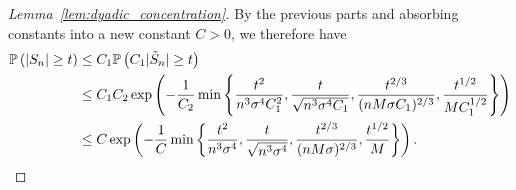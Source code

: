 \begin{proof}[Lemma~\ref{lem:dyadic_concentration}]

  By the previous parts
  and absorbing constants into a new constant $C > 0$,
  we therefore have
  \begin{align*}
    \P\left(
      |S_n| \geq t
    \right)
    &\leq
    C_1 \P\left(
      C_1 |\tilde S_n| \geq t
    \right) \\
    &\leq
    C_1 C_2 \exp\left(
      -\frac{1}{C_2}
      \min \left\{
      \frac{t^2}{n^3 \sigma^4 C_1^2},
      \frac{t}{\sqrt{n^3 \sigma^4 C_1}},
      \frac{t^{2/3}}{(n M \sigma C_1)^{2/3}},
      \frac{t^{1/2}}{M C_1^{1/2}}
      \right\}
    \right) \\
    &\leq
    C \exp\left(
      -\frac{1}{C}
      \min \left\{
      \frac{t^2}{n^3 \sigma^4},
      \frac{t}{\sqrt{n^3 \sigma^4}},
      \frac{t^{2/3}}{(n M \sigma)^{2/3}},
      \frac{t^{1/2}}{M}
      \right\}
    \right).
  \end{align*}
\end{proof}

